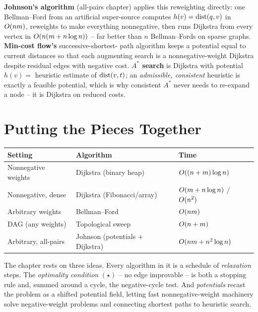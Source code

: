 \begin{connectionbox}
\textbf{Johnson's algorithm} (all-pairs chapter) applies this reweighting directly: one Bellman--Ford
from an artificial super-source computes $h(v)=\operatorname{dist}(q,v)$ in $O(nm)$, reweights to make
everything nonnegative, then runs Dijkstra from every vertex in $O(n(m+n\log n))$ -- far
better than $n$ Bellman--Fords on sparse graphs. \textbf{Min-cost flow's} successive-shortest-
path algorithm keeps a potential equal to current distances so that each augmenting search is
a nonnegative-weight Dijkstra despite residual edges with negative cost. \textbf{$A^\ast$
search} is Dijkstra with potential $h(v)=$ heuristic estimate of $\operatorname{dist}(v,t)$; an
\emph{admissible, consistent} heuristic is exactly a feasible potential, which is why
consistent $A^\ast$ never needs to re-expand a node -- it is Dijkstra on reduced costs.
\end{connectionbox}

\section{Putting the Pieces Together}
\label{ch07:summary}

\begin{center}
\begin{tabular}{lll}
\toprule
Setting & Algorithm & Time \\
\midrule
Nonnegative weights      & Dijkstra (binary heap)  & $O((n+m)\log n)$ \\
Nonnegative, dense       & Dijkstra (Fibonacci/array) & $O(m+n\log n)$ / $O(n^2)$ \\
Arbitrary weights        & Bellman--Ford           & $O(nm)$ \\
DAG (any weights)        & Topological sweep       & $O(n+m)$ \\
Arbitrary, all-pairs     & Johnson (potentials + Dijkstra) & $O(nm+n^2\log n)$ \\
\bottomrule
\end{tabular}
\end{center}

The chapter rests on three ideas. Every algorithm in it is a schedule of \emph{relaxation}
steps. The \emph{optimality condition} $(\star)$ -- no edge improvable -- is both a
stopping rule and, summed around a cycle, the negative-cycle test. And \emph{potentials}
recast the problem as a shifted potential field, letting fast nonnegative-weight machinery
solve negative-weight problems and connecting shortest paths to heuristic search.

